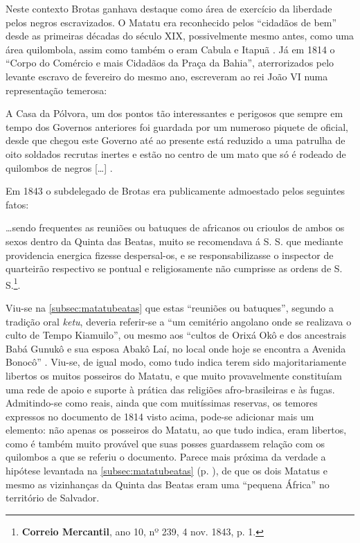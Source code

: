Neste contexto Brotas ganhava destaque como área de exercício da liberdade pelos negros escravizados. O Matatu era reconhecido pelos ``cidadãos de bem'' desde as primeiras décadas do século XIX, possivelmente mesmo antes, como uma área quilombola, assim como também o eram Cabula e Itapuã \cite[p.~377]{schwartz_1814_1996}. Já em 1814 o ``Corpo do Comércio e mais Cidadãos da Praça da Bahia'', aterrorizados pelo levante escravo de fevereiro do mesmo ano, escreveram ao rei João VI numa representação temerosa:

\begin{citacao}
A Casa da Pólvora, um dos pontos tão interessantes e perigosos que sempre em tempo dos Governos anteriores foi guardada por um numeroso piquete de oficial, desde que chegou este Governo até ao presente está reduzido a uma patrulha de oito soldados recrutas inertes e estão no centro de um mato que só é rodeado de quilombos de negros [\dots] \cite[pp.~103-106]{ott_formaet2_1957}.
\end{citacao}

Em 1843 o subdelegado de Brotas era publicamente admoestado pelos seguintes fatos:

\begin{citacao}
\dots sendo frequentes as reuniões ou batuques de africanos ou crioulos de ambos os sexos dentro da Quinta das Beatas, muito se recomendava á S. S. que mediante providencia energica fizesse despersal-os, e se responsabilizasse o inspector de quarteirão respectivo se pontual e religiosamente não cumprisse as ordens de S. S.\footnote{\textbf{Correio Mercantil}, ano 10, nº 239, 4 nov. 1843, p. 1.}.
\end{citacao}

Viu-se na \autoref{subsec:matatubeatas} que estas ``reuniões ou batuques'', segundo a tradição oral \textit{ketu}, deveria referir-se a ``um cemitério angolano onde se realizava o culto de Tempo Kiamuilo'', ou mesmo aos ``cultos de Orixá Okô e dos ancestrais Babá Gunukô e sua esposa Abakô Laí, no local onde hoje se encontra a Avenida Bonocô'' \cite[pp.~373-374]{silveira_alaketo_2003}. Viu-se, de igual modo, como tudo indica terem sido majoritariamente libertos os muitos posseiros do Matatu, e que muito provavelmente constituíam uma rede de apoio e suporte à prática das religiões afro-brasileiras e às fugas. Admitindo-se como reais, ainda que com muitíssimas reservas, os temores expressos no documento de 1814 visto acima, pode-se adicionar mais um elemento: não apenas os posseiros do Matatu, ao que tudo indica, eram libertos, como é também muito provável que suas posses guardassem relação com os quilombos a que se referiu o documento. Parece mais próxima da verdade a hipótese levantada na \autoref{subsec:matatubeatas} (p. \pageref{subsec:matatubeatas}), de que os dois Matatus e mesmo as vizinhanças da Quinta das Beatas eram uma ``pequena África'' no território de Salvador.

